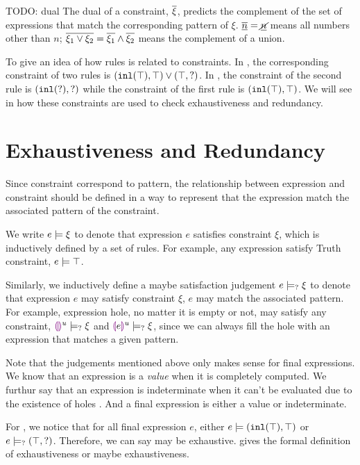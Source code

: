 \documentclass[acmsmall,screen,review,nonacm]{acmart}
\newcommand{\todo}[1]{{\color{red} TODO: #1}}
\theoremstyle{slplain}
\numberwithin{thm}{section}
\begin{document}
\todo{dual}
The dual of a constraint, $\overline{\xi}$, predicts the complement of the set of expressions that match the corresponding pattern of $\xi$.
\eg $\overline{\underline{n}}=\underline{\cancel{n}}$ means all numbers other than $n$;
$\overline{\xi_1 \vee \xi_2}=\overline{\xi_1} \wedge \overline{\xi_2}$ means the complement of a union.

To give an idea of how rules is related to constraints.
In , the corresponding constraint of two rules is $(\mathtt{inl}(\top) , \top) \vee (\top , \mathtt{?})$.
In , the constraint of the second rule is $(\mathtt{inl}(\mathtt{?}) , \mathtt{?})$ while the constraint of the first rule is $(\mathtt{inl}(\top) , \top)$.
We will see in  how these constraints are used to check exhaustiveness and redundancy.

\section{Exhaustiveness and Redundancy}
\label{sec:exhaustiveness-redundancy}

Since constraint correspond to pattern, the relationship between expression and constraint should be defined in a way to represent that the expression match the associated pattern of the constraint.

We write $e \models \xi$ to denote that expression $e$ satisfies constraint $\xi$, which is inductively defined by a set of rules. For example, any expression satisfy Truth constraint, $e \models \top$.

Similarly, we inductively define a maybe satisfaction judgement $e \models_{?} \xi$ to denote that expression $e$ may satisfy constraint $\xi$, \ie $e$ may match the associated pattern. For example, expression hole, no matter it is empty or not, may satisfy any constraint, \ie $\textcolor{violet}{\llparenthesis}\textcolor{violet}{\rrparenthesis}^{u} \models_{?} \xi$ and $\textcolor{violet}{\llparenthesis} e\textcolor{violet}{\rrparenthesis}^{u} \models_{?} \xi$, since we can always fill the hole with an expression that matches a given pattern.

Note that the judgements mentioned above only makes sense for final expressions. We know that an expression is a \emph{value} when it is completely computed. We furthur say that an expression is indeterminate when it can't be evaluated due to the existence of holes \cite{DBLP:journals/pacmpl/OmarVCH19}. And a final expression is either a value or indeterminate.

For , we notice that for all final expression $e$, either 
$e \models (\mathtt{inl}(\top) , \top)$ or $e \models_{?} (\top , \mathtt{?})$.
Therefore, we can say  may be exhaustive.  gives the formal definition of exhaustiveness or maybe exhaustiveness.
\end{document}
